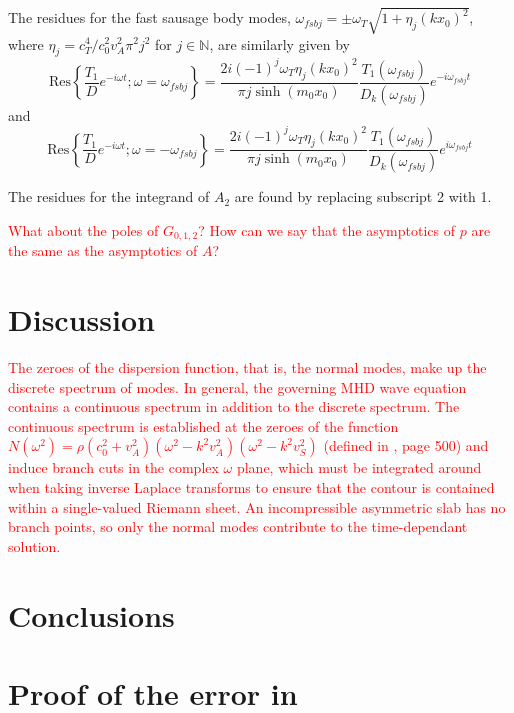 \documentclass[12pt]{../style-files/ociamthesis}
\begin{document}
The residues for the fast sausage body modes, $\omega_{fsbj} = \pm \omega_T\sqrt{1 + \eta_j(kx_0)^2}$, where $\eta_j = c_T^4 / c_0^2v_A^2\pi^2j^2$ for $j \in \mathbb{N}$, are similarly given by
\begin{equation}
\mathrm{Res}\left\{ \frac{T_1}{D}e^{-i\omega t}; \omega = \omega_{fsbj} \right\} = \frac{2i(-1)^{j}\omega_T\eta_j(kx_0)^2}{\pi j\sinh(m_0x_0)} \frac{T_1(\omega_{fsbj})}{D_k(\omega_{fsbj})}e^{-i\omega_{fsbj}t}
\end{equation}
and
\begin{equation}
\mathrm{Res}\left\{ \frac{T_1}{D}e^{-i\omega t}; \omega = -\omega_{fsbj} \right\} = \frac{2i(-1)^{j}\omega_T\eta_j(kx_0)^2}{\pi j\sinh(m_0x_0)} \frac{T_1(\omega_{fsbj})}{D_k(\omega_{fsbj})}e^{i\omega_{fsbj}t}
\end{equation}

The residues for the integrand of $A_2$ are found by replacing subscript 2 with 1.


\textcolor{red}{What about the poles of $G_{0,1,2}$? How can we say that the asymptotics of $p$ are the same as the asymptotics of $A$?}


\section{Discussion}
\textcolor{red}{
	The zeroes of the dispersion function, that is, the normal modes, make up the discrete spectrum of modes. In general, the governing MHD wave equation contains a continuous spectrum in addition to the discrete spectrum. The continuous spectrum is established at the zeroes of the function $N(\omega^2) = \rho (c_0^2 + v_A^2)(\omega^2 - k^2v_A^2)(\omega^2 - k^2v_S^2)$ (defined in \cite{goe_etal04}, page 500) and induce branch cuts in the complex $\omega$ plane, which must be integrated around when taking inverse Laplace transforms to ensure that the contour is contained within a single-valued Riemann sheet. An incompressible asymmetric slab has no branch points, so only the normal modes contribute to the time-dependant solution.}

\section{Conclusions}


\appendix

\section{Proof of the error in \cite{rae_etal81}}
\end{document}

